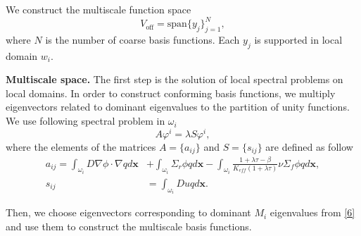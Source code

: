 \documentclass[runningheads]{llncs}
\begin{document}
We construct the multiscale function space
\[
{V}_{\text{off}} = \mbox{span} \{ y_j \}_{j=1}^{N},
\]
where $N$ is the number of coarse basis functions.
Each $y_j$ is supported in local domain $w_i$.

\textbf{Multiscale space.}
The first step is the solution of local spectral problems on local domains.  
In order to construct conforming basis functions, we multiply eigenvectors related to dominant eigenvalues to the partition of unity functions.
We use following spectral problem in $\omega_i$
\begin{equation} \label{6}
A \varphi^i = \lambda S \varphi^i,
\end{equation} 
where the elements of the matrices $A= \{ a_{ij} \}$ and $S = \{ s_{ij} \}$ are defined as follow{
\begin{equation} \label{7}
\begin{split}
a_{ij} = 
\int_{\omega_i} D \nabla\phi \cdot \nabla q d\bm x &+ 
\int_{\omega_i} \Sigma_r \phi q d\bm x - 
\int_{\omega_i} \frac{1+\lambda\tau-\beta}{K_{eff}(1+\lambda\tau)} \nu \Sigma_f \phi q d\bm x, \\
s_{ij} &= \int_{\omega _i} D u q d\bm x.
\end{split}
\end{equation}}

Then, we choose eigenvectors corresponding to dominant $M_{i}$ eigenvalues from \eqref{6} and use them to construct the multiscale basis functions.
\end{document}
